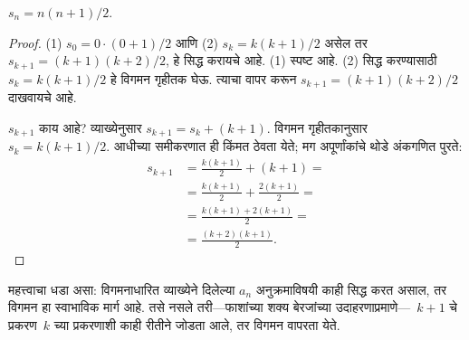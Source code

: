 \documentclass[../../../include/open-logic-section]{subfiles}
\begin{document}
\begin{prop}
  $s_n = n(n+1)/2$.
\end{prop}

\begin{proof}
(1) $s_0 = 0\cdot(0 + 1)/2$ आणि (2) $s_k = k(k+1)/2$ असेल तर $s_{k+1} = (k+1)(k+2)/2$, हे सिद्ध करायचे आहे. (1) स्पष्ट आहे. (2) सिद्ध करण्यासाठी $s_k = k(k+1)/2$ हे विगमन गृहीतक घेऊ. त्याचा वापर करून $s_{k+1} = (k+1)(k+2)/2$ दाखवायचे आहे.

$s_{k+1}$ काय आहे? व्याख्येनुसार $s_{k+1} = s_k + (k+1)$. विगमन गृहीतकानुसार $s_k = k(k+1)/2$. आधीच्या समीकरणात ही किंमत ठेवता येते; मग अपूर्णांकांचे थोडे अंकगणित पुरते:
\begin{align*}
    s_{k+1} & = \frac{k(k+1)}{2} + (k+1) = {}\\
    & = \frac{k(k+1)}{2} + \frac{2(k+1)}{2} = {}\\
    & = \frac{k(k+1) + 2(k+1)}{2} = {}\\
    & = \frac{(k+2)(k+1)}{2}.
\end{align*}
\end{proof}

महत्त्वाचा धडा असा: विगमनाधारित व्याख्येने दिलेल्या $a_n$ अनुक्रमाविषयी काही सिद्ध करत असाल, तर विगमन हा स्वाभाविक मार्ग आहे. तसे नसले तरी---फाशांच्या शक्य बेरजांच्या उदाहरणाप्रमाणे---~$k+1$ चे प्रकरण~$k$ च्या प्रकरणाशी काही रीतीने जोडता आले, तर विगमन वापरता येते.
\end{document}
